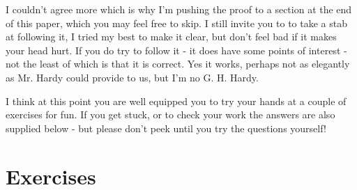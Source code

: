 \documentclass{article}
\begin{document}
I couldn't agree more which is why I'm pushing the proof to a section at the end of this paper, which you may
feel free to skip.
I still invite you to to take a stab at following it, I tried my best to make it clear, but don't feel bad if it
makes your head hurt. If you do try to follow it - it does have some points of interest - not the least
of which is that it is correct.
Yes it works,  perhaps not as elegantly as Mr. Hardy could provide to us, but I'm no G. H. Hardy.

I think at this point you are well equipped you to try your hands at a couple of exercises for fun. If you get stuck, or to
check your work the
answers are also supplied below - but please don't peek until you try the questions yourself!

\section*{Exercises}
\end{document}
